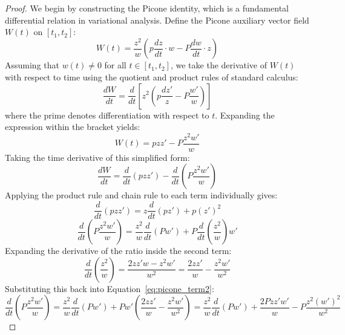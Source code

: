 \documentclass[11pt,a4paper]{book}
\begin{document}
\begin{proof}
We begin by constructing the Picone identity, which is a fundamental differential relation in variational analysis. Define the Picone auxiliary vector field $W(t)$ on $[t_1, t_2]$:
\begin{equation}
\label{eq:picone_vector}
W(t) = \frac{z^2}{w} \left( p \frac{dz}{dt} \cdot w - P \frac{dw}{dt} \cdot z \right)
\end{equation}
Assuming that $w(t) \ne 0$ for all $t \in [t_1, t_2]$, we take the derivative of $W(t)$ with respect to time using the quotient and product rules of standard calculus:
\begin{equation}
\label{eq:picone_derivative_1}
\frac{dW}{dt} = \frac{d}{dt}\left[ z^2 \left( p \frac{dz'}{z} - P \frac{w'}{w} \right) \right]
\end{equation}
where the prime denotes differentiation with respect to $t$. Expanding the expression within the bracket yields:
\begin{equation}
\label{eq:picone_expand}
W(t) = p z z' - P \frac{z^2 w'}{w}
\end{equation}
Taking the time derivative of this simplified form:
\begin{equation}
\label{eq:picone_deriv_expanded}
\frac{dW}{dt} = \frac{d}{dt}(p z z') - \frac{d}{dt}\left( P \frac{z^2 w'}{w} \right)
\end{equation}
Applying the product rule and chain rule to each term individually gives:
\begin{equation}
\label{eq:picone_term1}
\frac{d}{dt}(p z z') = z \frac{d}{dt}(p z') + p (z')^2
\end{equation}
\begin{equation}
\label{eq:picone_term2}
\frac{d}{dt}\left( P \frac{z^2 w'}{w} \right) = \frac{z^2}{w} \frac{d}{dt}(P w') + P \frac{d}{dt}\left(\frac{z^2}{w}\right) w'
\end{equation}
Expanding the derivative of the ratio inside the second term:
\begin{equation}
\label{eq:picone_ratio_deriv}
\frac{d}{dt}\left(\frac{z^2}{w}\right) = \frac{2 z z' w - z^2 w'}{w^2} = \frac{2 z z'}{w} - \frac{z^2 w'}{w^2}
\end{equation}
Substituting this back into Equation~\eqref{eq:picone_term2}:
\begin{equation}
\label{eq:picone_term2_full}
\frac{d}{dt}\left( P \frac{z^2 w'}{w} \right) = \frac{z^2}{w} \frac{d}{dt}(P w') + P w' \left( \frac{2 z z'}{w} - \frac{z^2 w'}{w^2} \right) = \frac{z^2}{w} \frac{d}{dt}(P w') + \frac{2 P z z' w'}{w} - P \frac{z^2 (w')^2}{w^2}

\end{equation}
\end{proof}
\end{document}

